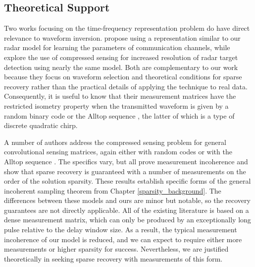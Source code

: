 \subsection{Theoretical Support}
Two works focusing on the time-frequency representation problem do have direct relevance to waveform inversion. \textcite{BSN08} propose using a representation similar to our radar model for learning the parameters of communication channels, while \textcite{HS09} explore the use of compressed sensing for increased resolution of radar target detection using nearly the same model. Both are complementary to our work because they focus on waveform selection and theoretical conditions for sparse recovery rather than the practical details of applying the technique to real data. Consequently, it is useful to know that their measurement matrices have the restricted isometry property when the transmitted waveform is given by a random binary code \autocite{BSN08} or the Alltop sequence \autocite{HS09}, the latter of which is a type of discrete quadratic chirp.

A number of authors address the compressed sensing problem for general convolutional sensing matrices, again either with random codes \autocite{TWD+06, BHR+07, Rom09, PR10} or with the Alltop sequence \autocite{PR10}. The specifics vary, but all prove measurement incoherence and show that sparse recovery is guaranteed with a number of measurements on the order of the solution sparsity. These results establish specific forms of the general incoherent sampling theorem from Chapter \ref{sparsity_background}. The differences between these models and ours are minor but notable, so the recovery guarantees are not directly applicable. All of the existing literature is based on a dense measurement matrix, which can only be produced by an exceptionally long pulse relative to the delay window size. As a result, the typical measurement incoherence of our model is reduced, and we can expect to require either more measurements or higher sparsity for success. Nevertheless, we are justified theoretically in seeking sparse recovery with measurements of this form.

